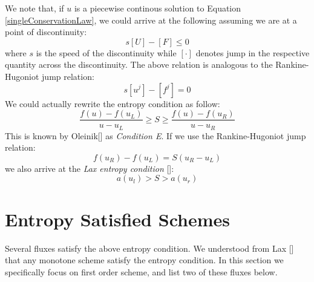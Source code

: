 \documentclass[a4paper]{article}
\numberwithin{equation}{section}
\begin{document}
We note that, if $u$ is a piecewise continous solution to Equation \ref{singleConservationLaw}, we could arrive at the following assuming we are at a point of discontinuity:
\begin{equation}
    s \left[U\right] - \left[F\right] \leq 0
\end{equation}
where $s$ is the speed of the discontinuity while $\left[\cdot\right]$ denotes jump in the respective quantity across the discontinuity. The above relation is analogous to the Rankine-Hugoniot jump relation:
\begin{equation}
    s \left[u^j\right] - \left[f^j\right] = 0
\end{equation}
We could actually rewrite the entropy condition as follow:
\begin{equation}
    \frac{f(u) - f(u_L)}{u-u_L} \geq S \geq \frac{f(u) - f(u_R)}{u-u_R}
\end{equation}
This is known by Oleinik[] as \textit{Condition E}. If we use the Rankine-Hugoniot jump relation:
\begin{equation}
    f(u_R) - f(u_L) = S(u_R - u_L)
\end{equation}
we also arrive at the \textit{Lax entropy condition} []:
\begin{equation}
    a(u_l) > S > a(u_r)
\end{equation}

\section{Entropy Satisfied Schemes}
Several fluxes satisfy the above entropy condition. We understood from Lax [] that any monotone scheme satisfy the entropy condition. In this section we specifically focus on first order scheme, and list two of these fluxes below.
\end{document}

